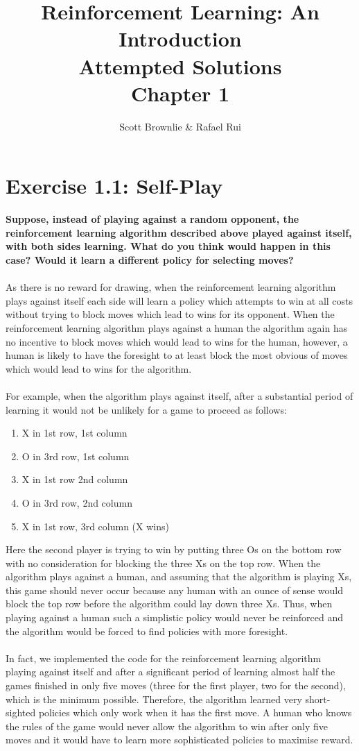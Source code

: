 \documentclass[a4paper,11pt]{article}
\title{Reinforcement Learning: An Introduction \\ Attempted Solutions \\ Chapter 1}
\author{Scott Brownlie \& Rafael Rui}
\date{}
\numberwithin{equation}{section}
\theoremstyle{remark}
\begin{document}
\maketitle

\section{Exercise 1.1: Self-Play}

\textbf{Suppose, instead of playing against a random opponent, the reinforcement learning algorithm described above played against itself, with both sides learning. What do you think would happen in this case? Would it learn a different policy for selecting moves?}
\\ \\
As there is no reward for drawing, when the reinforcement learning algorithm plays against itself each side will learn a policy which attempts to win at all costs without trying to block moves which lead to wins for its opponent. When the reinforcement learning algorithm plays against a human the algorithm again has no incentive to block moves which would lead to wins for the human, however, a human is likely to have the foresight to at least block the most obvious of moves which would lead to wins for the algorithm. 
\\ \\
For example, when the algorithm plays against itself, after a substantial period of learning it would not be unlikely for a game to proceed as follows: 
\begin{enumerate}
	\item X in 1st row, 1st column
	\item O in 3rd row, 1st column
	\item X in 1st row 2nd column
	\item O in 3rd row, 2nd column
	\item X in 1st row, 3rd column (X wins)	
\end{enumerate}
Here the second player is trying to win by putting three Os on the bottom row with no consideration for blocking the three Xs on the top row. When the algorithm plays against a human, and assuming that the algorithm is playing Xs, this game should never occur because any human with an ounce of sense would block the top row before the algorithm could lay down three Xs. Thus, when playing against a human such a simplistic policy would never be reinforced and the algorithm would be forced to find policies with more foresight. 
\\ \\
In fact, we implemented the code for the reinforcement learning algorithm playing against itself and after a significant period of learning almost half the games finished in only five moves (three for the first player, two for the second), which is the minimum possible. Therefore, the algorithm learned very short-sighted policies which only work when it has the first move. A human who knows the rules of the game would never allow the algorithm to win after only five moves and it would have to learn more sophisticated policies to maximise reward.
\end{document}
